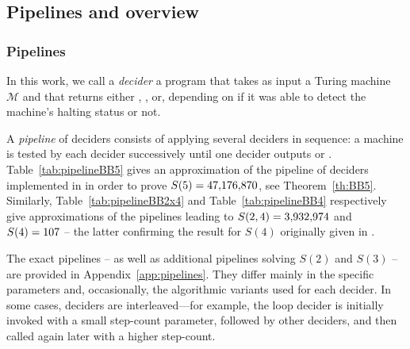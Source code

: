 \subsection{Pipelines and overview}

\subsubsection{Pipelines}\label{sec:pipelines}

In this work, we call a \textit{decider} a program that takes as input a Turing machine $\mathcal{M}$ and that returns either \HALT, \NONHALT, or, \UNKNOWN depending on if it was able to detect the machine's halting status or not.

A \textit{pipeline} of deciders consists of applying several deciders in sequence: a machine is tested by each decider successively until one decider outputs \HALT or \NONHALT. Table~\ref{tab:pipelineBB5} gives an approximation of the pipeline of deciders implemented in \CoqBB in order to prove $S(5) = 47{,}176{,}870$, see Theorem~\ref{th:BB5}. Similarly, Table~\ref{tab:pipelineBB2x4} and Table~\ref{tab:pipelineBB4} respectively give approximations of the pipelines leading to $S(2,4) = 3{,}932{,}974$ and $S(4) = 107$ -- the latter confirming the result for $S(4)$ originally given in \cite{Brady83}.

The exact pipelines -- as well as additional pipelines solving $S(2)$ and $S(3)$ -- are provided in Appendix~\ref{app:pipelines}. They differ mainly in the specific parameters and, occasionally, the algorithmic variants used for each decider. In some cases, deciders are interleaved—for example, the loop decider is initially invoked with a small step-count parameter, followed by other deciders, and then called again later with a higher step-count. %


